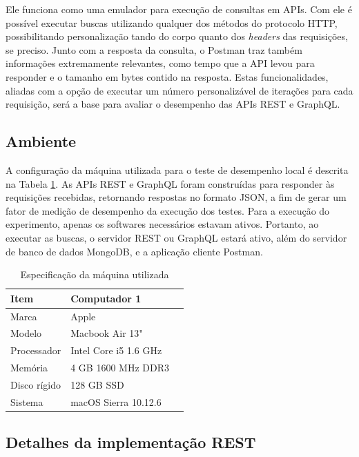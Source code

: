 Ele funciona como uma emulador para execução de consultas em APIs. Com ele é possível executar buscas utilizando qualquer dos métodos do protocolo HTTP, possibilitando personalização tando do corpo quanto dos \textit{headers} das requisições, se preciso. Junto com a resposta da consulta, o Postman traz também informações extremamente relevantes, como tempo que a API levou para responder e o tamanho em bytes contido na resposta. Estas funcionalidades, aliadas com a opção de executar um número personalizável de iterações para cada requisição, será a base para avaliar o desempenho das APIs REST e GraphQL.

\subsection{Ambiente}

A configuração da máquina utilizada para o teste de desempenho local é descrita na Tabela \ref{tab:computers}. As APIs REST e GraphQL foram construídas para responder às requisições recebidas, retornando respostas no formato JSON, a fim de gerar um fator de medição de desempenho da execução dos testes. Para a execução do experimento, apenas os softwares necessários estavam ativos. Portanto, ao executar as buscas, o servidor REST ou GraphQL estará ativo, além do servidor de banco de dados MongoDB, e a aplicação cliente Postman.

\begin{table}[htbp]
    \centering
    \begin{tabular}{| l | l | l |}
        \hline
        \textbf{Item} & \textbf{Computador 1} \\ \hline
        Marca         & Apple                 \\ \hline
        Modelo        & Macbook Air 13"       \\ \hline
        Processador   & Intel Core i5 1.6 GHz \\ \hline
        Memória       & 4 GB 1600 MHz DDR3    \\ \hline
        Disco rígido  & 128 GB SSD            \\ \hline
        Sistema       & macOS Sierra 10.12.6  \\ \hline
    \end{tabular}
    \caption{Especificação da máquina utilizada} \label{tab:computers}
\end{table}

\subsection{Detalhes da implementação REST}

